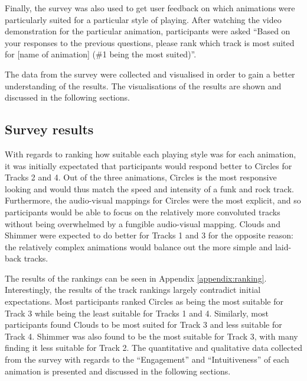 \documentclass[../initial_thesis.tex]{subfiles}
\begin{document}
Finally, the survey was also used to get user feedback on which animations were particularly suited for a particular style of playing. After watching the video demonstration for the particular animation, participants were asked ``Based on your responses to the previous questions, please rank which track is most suited for [name of animation] (\#1 being the most suited)''.

The data from the survey were collected and visualised in order to gain a better understanding of the results. The visualisations of the results are shown and discussed in the following sections.

\subsection{Survey results}
With regards to ranking how suitable each playing style was for each animation, it was initially expectated that participants would respond better to Circles for Tracks 2 and 4. Out of the three animations, Circles is the most responsive looking and would thus match the speed and intensity of a funk and rock track. Furthermore, the audio-visual mappings for Circles were the most explicit, and so participants would be able to focus on the relatively more convoluted tracks without being overwhelmed by a fungible audio-visual mapping. Clouds and Shimmer were expected to do better for Tracks 1 and 3 for the opposite reason: the relatively complex animations would balance out the more simple and laid-back tracks.\par

The results of the rankings can be seen in Appendix \ref{appendix:ranking}. Interestingly, the results of the track rankings largely contradict initial expectations. Most participants ranked Circles as being the most suitable for Track 3 while being the least suitable for Tracks 1 and 4. Similarly, most participants found Clouds to be most suited for Track 3 and less suitable for Track 4. Shimmer was also found to be the most suitable for Track 3, with many finding it less suitable for Track 2. The quantitative and qualitative data collected from the survey with regards to the ``Engagement'' and ``Intuitiveness'' of each animation is presented and discussed in the following sections.
\end{document}
